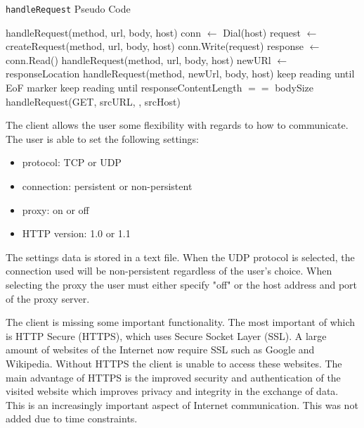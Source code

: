 \documentclass[10pt,twocolumn]{witseiepaper}
\begin{document}
	\begin{algorithm}
	\caption{\texttt{handleRequest} Pseudo Code}
	\label{handlereq}
		\begin{algorithmic}
			\State handleRequest(method, url, body, host)
			\State conn $\gets$ Dial(host)
			\State request $\gets$ createRequest(method, url, body, host)
			\State conn.Write(request)
			\State response $\gets$ conn.Read()
				\State handleRequest(method, url, body, host)
				\State \Return
			\EndIf
				\State newURl $\gets$ responseLocation
				\State handleRequest(method, newUrl, body, host)
				\State \Return
			\EndIf
				\State keep reading until EoF marker
				\State keep reading until responseContentLength $==$ bodySize
			\EndIf
				\State handleRequest(GET, srcURL, , srcHost)
			\EndFor
		\end{algorithmic}
	\end{algorithm}

	The client allows the user some flexibility with regards to how to communicate. The user is able to set the following settings:

	\begin{itemize}
		\item protocol: TCP or UDP
		\item connection: persistent or non-persistent
		\item proxy: on or off
		\item HTTP version: 1.0 or 1.1
	\end{itemize}

	The settings data is stored in a text file. When the UDP protocol is selected, the connection used will be non-persistent regardless of the user's choice. When selecting the proxy the user must either specify "off" or the host address and port of the proxy server.

	The client is missing some important functionality. The most important of which is HTTP Secure (HTTPS), which uses Secure Socket Layer (SSL). A large amount of websites of the Internet now require SSL such as Google and Wikipedia. Without HTTPS the client is unable to access these websites. The main advantage of HTTPS is the improved security and authentication of the visited website which improves privacy and integrity in the exchange of data. This is an increasingly important aspect of Internet communication. This was not added due to time constraints.
\end{document}
